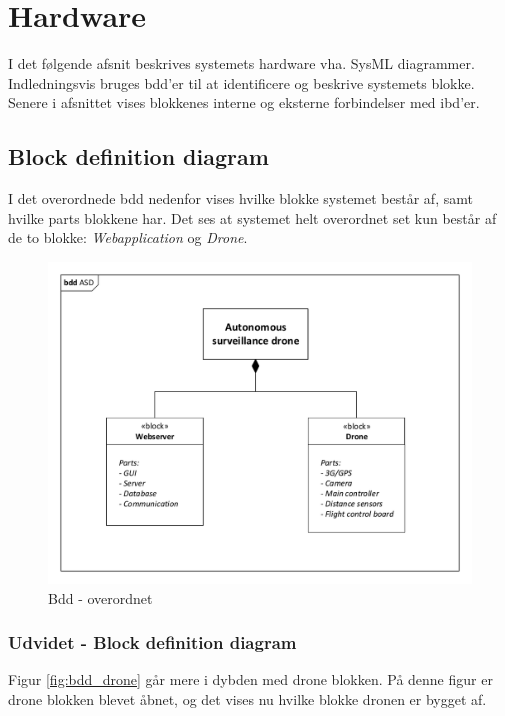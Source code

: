 \chapter{Hardware}

I det følgende afsnit beskrives systemets hardware vha. SysML diagrammer. 
Indledningsvis bruges bdd'er til at identificere og beskrive systemets blokke. Senere i afsnittet vises blokkenes interne og eksterne forbindelser med ibd'er.

\section{Block definition diagram}
I det overordnede bdd nedenfor vises hvilke blokke systemet består af, samt hvilke parts blokkene har. Det ses at systemet helt overordnet set kun består af de to blokke: \textit{Webapplication} og \textit{Drone}. 

\begin{figure}[H]
\centering
\includegraphics[width=1\textwidth]{Billeder/BDD/bdd_overordnet.pdf}
\caption{Bdd - overordnet}
\label{fig:bdd_overordnet}
\end{figure}

\newpage
\subsection{Udvidet - Block definition diagram}
Figur \ref{fig:bdd_drone} går mere i dybden med drone blokken. På denne figur er drone blokken blevet åbnet, og det vises nu hvilke blokke dronen er bygget af. 

